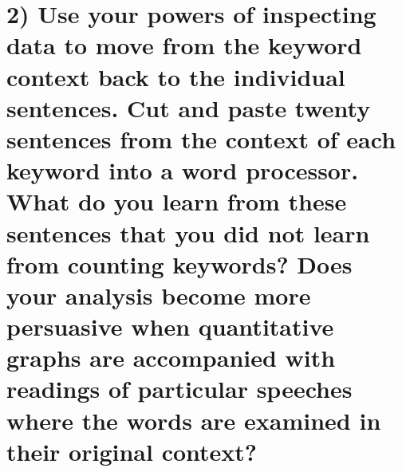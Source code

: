 \documentclass[
]{article}
\begin{document}
\section{2) Use your powers of inspecting data to move from the keyword
context back to the individual sentences. Cut and paste twenty sentences
from the context of each keyword into a word processor. What do you
learn from these sentences that you did not learn from counting
keywords? Does your analysis become more persuasive when quantitative
graphs are accompanied with readings of particular speeches where the
words are examined in their original
context?}\label{use-your-powers-of-inspecting-data-to-move-from-the-keyword-context-back-to-the-individual-sentences.-cut-and-paste-twenty-sentences-from-the-context-of-each-keyword-into-a-word-processor.-what-do-you-learn-from-these-sentences-that-you-did-not-learn-from-counting-keywords-does-your-analysis-become-more-persuasive-when-quantitative-graphs-are-accompanied-with-readings-of-particular-speeches-where-the-words-are-examined-in-their-original-context}
\end{document}

